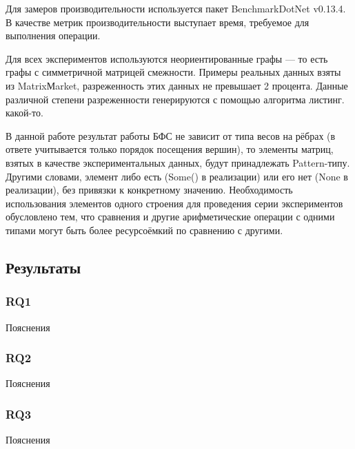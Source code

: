 Для замеров производительности используется пакет BenchmarkDotNet v0.13.4. В качестве метрик производительности выступает время, требуемое для выполнения операции.

Для всех экспериментов используются неориентированные графы --- то есть графы с симметричной матрицей смежности. Примеры реальных данных взяты из MatrixМarket, разреженность этих данных не превышает 2 процента. Данные различной степени разреженности генерируются с помощью алгоритма листинг. какой-то. 

В данной работе результат работы БФС не зависит от типа весов на рёбрах (в ответе учитывается только порядок посещения вершин), то элементы матриц, взятых в качестве экспериментальных данных, будут принадлежать Pattern-типу. Другими словами, элемент либо есть (Some() в реализации) или его нет (None в реализации), без привязки к конкретному значению. Необходимость использования элементов одного строения для проведения серии экспериментов обусловлено тем, что сравнения и другие арифметические операции с одними типами могут быть более ресурсоёмкий по сравнению с другими.

\subsection{Результаты}

\subsubsection{RQ1} Пояснения
\subsubsection{RQ2} Пояснения
\subsubsection{RQ3} Пояснения
